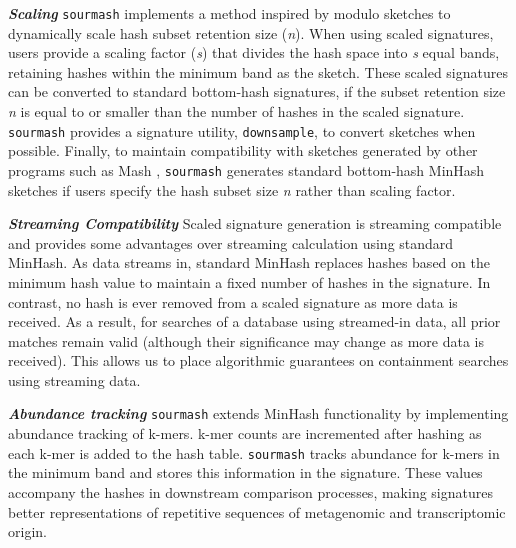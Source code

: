 \documentclass[10pt,a4paper,twocolumn]{article}
\begin{document}
\textit{\textbf{Scaling}} \lstinline{sourmash} implements a method inspired by modulo sketches \cite{broder1997resemblance} to dynamically scale hash subset retention size (\textit{n}). When using scaled signatures, users provide  a scaling factor (\textit{s}) that divides the hash space into \textit{s} equal bands, retaining hashes within the minimum band as the sketch. These scaled signatures can be converted to standard bottom-hash signatures, if the subset retention size \textit{n} is equal to or smaller than the number of hashes in the scaled signature. \lstinline{sourmash} provides a signature utility, \lstinline{downsample}, to convert sketches when possible. Finally, to maintain compatibility with sketches generated by other programs such as Mash \cite{ondov2016mash}, \lstinline{sourmash} generates standard bottom-hash MinHash sketches if users specify the hash subset size \textit{n} rather than scaling factor.




\textit{\textbf{Streaming Compatibility}} Scaled signature generation is streaming compatible and provides some advantages over streaming calculation using standard MinHash. As data streams in, standard MinHash replaces hashes based on the minimum hash value to maintain a fixed number of hashes in the signature. In contrast, no hash is ever removed from a scaled signature as more data is received. As a result, for searches of a database using streamed-in data, all prior matches remain valid (although their significance may change as more data is received). This allows us to place algorithmic guarantees on containment searches using streaming data.


\textit{\textbf{Abundance tracking}} \lstinline{sourmash} extends MinHash functionality by implementing abundance tracking of k-mers. k-mer counts are incremented after hashing as each k-mer is added to the hash table. \lstinline{sourmash} tracks abundance for k-mers in the minimum band and stores this information in the signature. These values accompany the hashes in downstream comparison processes, making signatures better representations of repetitive sequences of metagenomic and transcriptomic origin. 
\end{document}
